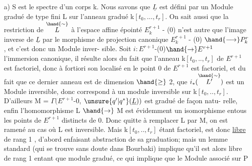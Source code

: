a) S est le spectre d'un corps k. Nous savons que $\underline{L}$ est défini
par un Module gradué de type fini L sur l'anneau gradué k$[t_0,\ldots,t_r]$.
On sait aussi que la restriction  de $\overset{\hand{\sim}}{L}$ à l'espace affine épointé
$E_k^{r+1}$ - (0) n'est autre que l'image inverse de $\underline{L}$ par le morphisme de
projection canonique  $E_k^{r+1}$ - (0) $\hand{\longrightarrow} P_k^r$ , et c'est donc un Module inver-%
sible. Soit $i : E^{r+1}$-(0)$\hand{\to} E^{r+1}$ l'immersion canonique, il résulte
alors du fait que l'anneau  k$[t_0,..,t_r]$ de $E^{r+1}$ est factoriel, donc à
fortiori son localisé en le point 0 de $E^{r+1}$ est factoriel, et du fait
que ce dernier anneau est de dimension $\hand{\geq}$ 2, que $i_*(\overset{\hand{\sim}}{L'})$ est un Module
inversible,  donc correspond à un module inversible  sur
k$[t_0,..,t_r]$. D'ailleurs M = $\Gamma(E^{r+1}$-0, $\unsure{q'|q^*}(\underline{L}))$ est gradué de façon natu-%
relle, enfin l'homomorphisme L $\hand{\to}$ M est évidemment un isomorphisme
entous les  points de $E^{r+1}$ distincts de 0. Donc quitte à
remplacer L par M, on est ramené au cas où L est inversible. Mais
k$[t_0,..,t_r]$ étant factoriel,  est donc \uline{libre} de rang 1 , d'abord
enfaisant abstraction de sa graduation; mais un lemme standard (qui se
trouve sans doute dans Bourbaki) implique qu'il est alors libre de rang 1
entant que module gradué, ce qui implique que le Module associé sur P\margin{\ensuremath{\backslash}}

